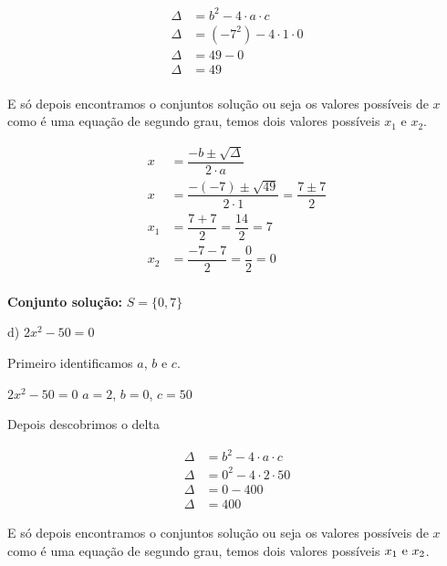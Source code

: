 \documentclass[letterpaper]{book}
\begin{document}
\begin{align*}
\Delta &= b^{2} - 4 \cdot a \cdot c \\
\Delta &= (-7^{2}) - 4 \cdot 1 \cdot 0 \\
\Delta &= 49 - 0 \\
\Delta &= 49 \\
\end{align*}

E só depois encontramos o conjuntos solução ou seja os valores possíveis de \(x\) como é uma equação de segundo grau, temos dois valores possíveis \(x_1\) e \(x_2\).

\begin{align*}
x &= \dfrac{-b \pm \sqrt{\Delta}}{2 \cdot a} \\
x &= \dfrac{-(-7) \pm \sqrt{49}}{2 \cdot 1} = \dfrac{7 \pm 7}{2} \\
x_1 &= \dfrac{7 + 7}{2} = \dfrac{14}{2} = 7 \\
x_2 &= \dfrac{-7 - 7}{2} = \dfrac{0}{2} = 0 \\
\end{align*}

\begin{center}
\textbf{Conjunto solução:} \(S = \{0, 7\}\)
\end{center}

d) \(2x^{2} - 50 = 0\)

\vspace{0.5em}

Primeiro identificamos \(a\), \(b\) e \(c\).

\vspace{0.5em}

\(2x^{2} - 50 = 0\)
\(a = 2\), $b = 0$, $c = 50$

\vspace{0.5em}

Depois descobrimos o delta

\begin{align*}
\Delta &= b^{2} - 4 \cdot a \cdot c \\
\Delta &= 0^{2} - 4 \cdot 2 \cdot 50 \\
\Delta &= 0 - 400 \\
\Delta &= 400 
\end{align*}

E só depois encontramos o conjuntos solução ou seja os valores possíveis de \(x\) como é uma equação de segundo grau, temos dois valores possíveis \(x_1$ e \(x_2\).

\vspace{0.5em}
\end{document}
